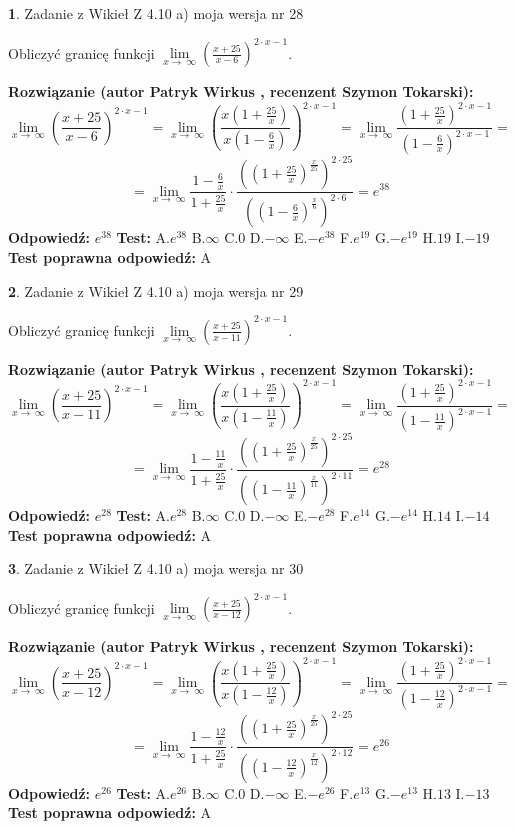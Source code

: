 \documentclass[12pt, a4paper]{article}
\theoremstyle{definition} %
\newtheorem{zad}{}
\newcommand{\zadStart}[1]{\begin{zad}#1\newline}
\newcommand{\zadStop}{\end{zad}}
\newcommand{\rozwStart}[2]{\noindent \textbf{Rozwiązanie (autor #1 , recenzent #2): }\newline}
\newcommand{\rozwStop}{\newline}
\newcommand{\odpStart}{\noindent \textbf{Odpowiedź:}\newline}
\newcommand{\odpStop}{\newline}
\newcommand{\testStart}{\noindent \textbf{Test:}\newline}
\newcommand{\testStop}{\newline}
\newcommand{\kluczStart}{\noindent \textbf{Test poprawna odpowiedź:}\newline}
\newcommand{\kluczStop}{\newline}
\begin{document}
\zadStart{Zadanie z Wikieł Z 4.10 a) moja wersja nr 28}

Obliczyć granicę funkcji  $\lim\limits_{x\to\ \infty}(\frac{x+25}{x-6})^{2\cdot x-1}$.
\zadStop
\rozwStart{Patryk Wirkus}{Szymon Tokarski}
$$\lim\limits_{x\to\ \infty}(\frac{x+25}{x-6})^{2\cdot x-1} = \lim\limits_{x\to\ \infty}(\frac{x(1+\frac{25}{x})}{x(1-\frac{6}{x})})^{2\cdot x-1}=\lim\limits_{x\to\ \infty}\frac{(1+\frac{25}{x})^{2\cdot x-1}}{(1-\frac{6}{x})^{2\cdot x-1}}=$$
$$=\lim\limits_{x\to\ \infty}\frac{1-\frac{6}{x}}{1+\frac{25}{x}}\cdot\frac{((1+\frac{25}{x})^{\frac{x}{25}})^{2\cdot25}}{((1-\frac{6}{x})^{\frac{x}{6}})^{2\cdot6}}=e^{38}$$
\rozwStop
\odpStart
$e^{38}$
\odpStop
\testStart
A.$e^{38}$ B.$\infty$ C.$0$ D.$-\infty$ E.$-e^{38}$
F.$e^{19}$ G.$-e^{19}$
H.$19$
I.$-19$
\testStop
\kluczStart
A
\kluczStop



\zadStart{Zadanie z Wikieł Z 4.10 a) moja wersja nr 29}

Obliczyć granicę funkcji  $\lim\limits_{x\to\ \infty}(\frac{x+25}{x-11})^{2\cdot x-1}$.
\zadStop
\rozwStart{Patryk Wirkus}{Szymon Tokarski}
$$\lim\limits_{x\to\ \infty}(\frac{x+25}{x-11})^{2\cdot x-1} = \lim\limits_{x\to\ \infty}(\frac{x(1+\frac{25}{x})}{x(1-\frac{11}{x})})^{2\cdot x-1}=\lim\limits_{x\to\ \infty}\frac{(1+\frac{25}{x})^{2\cdot x-1}}{(1-\frac{11}{x})^{2\cdot x-1}}=$$
$$=\lim\limits_{x\to\ \infty}\frac{1-\frac{11}{x}}{1+\frac{25}{x}}\cdot\frac{((1+\frac{25}{x})^{\frac{x}{25}})^{2\cdot25}}{((1-\frac{11}{x})^{\frac{x}{11}})^{2\cdot11}}=e^{28}$$
\rozwStop
\odpStart
$e^{28}$
\odpStop
\testStart
A.$e^{28}$ B.$\infty$ C.$0$ D.$-\infty$ E.$-e^{28}$
F.$e^{14}$ G.$-e^{14}$
H.$14$
I.$-14$
\testStop
\kluczStart
A
\kluczStop



\zadStart{Zadanie z Wikieł Z 4.10 a) moja wersja nr 30}

Obliczyć granicę funkcji  $\lim\limits_{x\to\ \infty}(\frac{x+25}{x-12})^{2\cdot x-1}$.
\zadStop
\rozwStart{Patryk Wirkus}{Szymon Tokarski}
$$\lim\limits_{x\to\ \infty}(\frac{x+25}{x-12})^{2\cdot x-1} = \lim\limits_{x\to\ \infty}(\frac{x(1+\frac{25}{x})}{x(1-\frac{12}{x})})^{2\cdot x-1}=\lim\limits_{x\to\ \infty}\frac{(1+\frac{25}{x})^{2\cdot x-1}}{(1-\frac{12}{x})^{2\cdot x-1}}=$$
$$=\lim\limits_{x\to\ \infty}\frac{1-\frac{12}{x}}{1+\frac{25}{x}}\cdot\frac{((1+\frac{25}{x})^{\frac{x}{25}})^{2\cdot25}}{((1-\frac{12}{x})^{\frac{x}{12}})^{2\cdot12}}=e^{26}$$
\rozwStop
\odpStart
$e^{26}$
\odpStop
\testStart
A.$e^{26}$ B.$\infty$ C.$0$ D.$-\infty$ E.$-e^{26}$
F.$e^{13}$ G.$-e^{13}$
H.$13$
I.$-13$
\testStop
\kluczStart
A
\kluczStop
\end{document}
